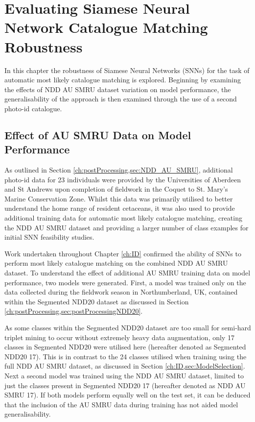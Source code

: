 \chapter{Evaluating Siamese Neural Network Catalogue Matching Robustness}\label{ch:SNNEvaluation}

In this chapter the robustness of Siamese Neural Networks (SNNs) for the task of automatic most likely catalogue matching is explored. Beginning by examining the effects of NDD AU SMRU dataset variation on model performance, the generalisability of the approach is then examined through the use of a second photo-id catalogue. 

\section{Effect of AU SMRU Data on Model Performance}\label{ch:SNNEvaluation,sec:EffectOfAUSMRU}

As outlined in Section \ref{ch:postProcessing,sec:NDD_AU_SMRU}, additional photo-id data for 23 individuals were provided by the Universities of Aberdeen and St Andrews upon completion of fieldwork in the Coquet to St. Mary's Marine Conservation Zone. Whilst this data was primarily utilised to better understand the home range of resident cetaceans, it was also used to provide additional training data for automatic most likely catalogue matching, creating the NDD AU SMRU dataset and providing a larger number of class examples for initial SNN feasibility studies. 

Work undertaken throughout Chapter \ref{ch:ID} confirmed the ability of SNNs to perform most likely catalogue matching on the combined NDD AU SMRU dataset. To understand the effect of additional AU SMRU training data on model performance, two models were generated. First, a model was trained only on the data collected during the fieldwork season in Northumberland, UK, contained within the Segmented NDD20 dataset as discussed in Section \ref{ch:postProcessing,sec:postProcessingNDD20}. 

As some classes within the Segmented NDD20 dataset are too small for semi-hard triplet mining to occur without extremely heavy data augmentation, only 17 classes in Segmented NDD20 were utilised here (hereafter denoted as Segmented NDD20 17). This is in contrast to the 24 classes utilised when training using the full NDD AU SMRU dataset, as discussed in Section \ref{ch:ID,sec:ModelSelection}. Next a second model was trained using the NDD AU SMRU dataset, limited to just the classes present in Segmented NDD20 17 (hereafter denoted as NDD AU SMRU 17). If both models perform equally well on the test set, it can be deduced that the inclusion of the AU SMRU data during training has not aided model generalisability. 

